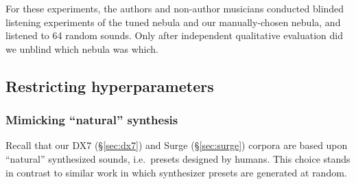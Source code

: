 For these experiments, the authors and non-author musicians conducted blinded listening experiments of the tuned nebula and our manually-chosen nebula, and listened to 64 random sounds. Only after independent qualitative evaluation did we unblind which nebula was which.

\subsection{Restricting hyperparameters}


\iffalse
\subsubsection{Mimicking ``natural'' synthesis}

Recall that our DX7 (\S\ref{sec:dx7}) and Surge (\S\ref{sec:surge}) corpora are based upon ``natural'' synthesized sounds, i.e.\ presets designed by humans. This choice stands in contrast to similar work in which synthesizer presets are generated at random.

